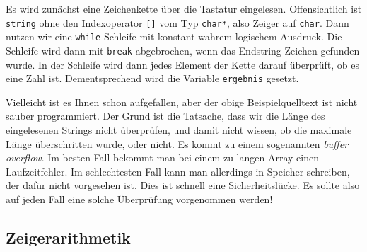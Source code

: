 Es wird zunächst eine Zeichenkette über die Tastatur eingelesen.
Offensichtlich ist \verb|string| ohne den Indexoperator \verb|[]| vom Typ \verb|char*|, also Zeiger auf \verb|char|.
Dann nutzen wir eine \verb|while| Schleife mit konstant wahrem logischem Ausdruck.
Die Schleife wird dann mit \verb|break| abgebrochen, wenn das Endstring-Zeichen gefunden wurde.
In der Schleife wird dann jedes Element der Kette darauf überprüft, ob es eine Zahl ist.
Dementsprechend wird die Variable \verb|ergebnis| gesetzt.

Vielleicht ist es Ihnen schon aufgefallen, aber der obige Beispielquelltext ist nicht sauber programmiert.
Der Grund ist die Tatsache, dass wir die Länge des eingelesenen Strings nicht überprüfen, und damit nicht wissen, ob die maximale Länge überschritten wurde, oder nicht.
Es kommt zu einem sogenannten \emph{buffer overflow}.
Im besten Fall bekommt man bei einem zu langen Array einen Laufzeitfehler.
Im schlechtesten Fall kann man allerdings in Speicher schreiben, der dafür nicht vorgesehen ist. Dies ist schnell eine Sicherheitslücke.
Es sollte also auf jeden Fall eine solche Überprüfung vorgenommen werden!

\subsection{Zeigerarithmetik}

